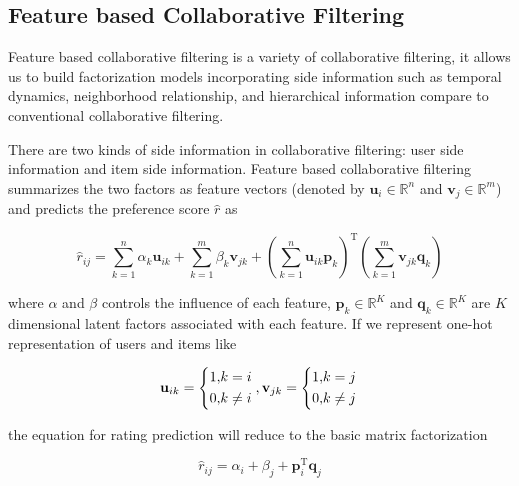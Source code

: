 \documentclass{llncs}
\begin{document}
\subsection{Feature based Collaborative Filtering}
Feature based collaborative filtering \cite{chen2011feature} is a variety of
collaborative filtering, it allows us to build factorization models incorporating
side information such as temporal dynamics, neighborhood relationship,
and hierarchical information compare to conventional collaborative filtering.

There are two kinds of side information in collaborative filtering:
user side information and item side information.
Feature based collaborative filtering summarizes the two factors as feature vectors
(denoted by $\mathbf{u}_i \in \mathbb{R}^{n}$ and $\mathbf{v}_j \in \mathbb{R}^{m}$) and predicts
the preference score $\hat{r}$ as

\begin{equation}
\hat{r}_{ij} = \sum_{k=1}^{n} \alpha_k \mathbf{u}_{ik} + \sum_{k=1}^{m} \beta_k \mathbf{v}_{jk} +
\left( \sum_{k=1}^{n} \mathbf{u}_{ik} \mathbf{p}_k \right) ^ \mathrm{T}
\left( \sum_{k=1}^{m} \mathbf{v}_{jk} \mathbf{q}_k \right)
\end{equation}

where $\alpha$ and $\beta$ controls the influence of each feature,
$\mathbf{p}_{k} \in \mathbb{R}^K$ and $\mathbf{q}_{k} \in \mathbb{R}^K$
are $K$ dimensional latent factors associated with each feature.
If we represent one-hot representation of users and items like

\begin{equation}
\mathbf{u}_{ik} =
\left\{
\begin{aligned}
1, &k = i \\
0, &k \not= i
\end{aligned}
\right. \\ , 
\mathbf{v}_{jk} =
\left\{
\begin{aligned}
1, &k = j \\
0, &k \not= j
\end{aligned}
\right. \\
\end{equation}

the equation for rating prediction will reduce to the basic matrix factorization

\begin{equation}
\hat{r}_{ij} = \alpha_i + \beta_j + \mathbf{p}_i ^ \mathrm{T} \mathbf{q}_j
\end{equation}
\end{document}
